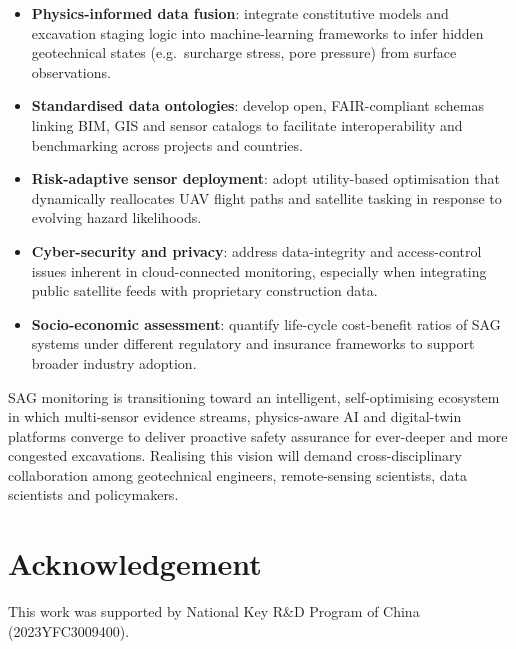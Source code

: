 \documentclass[preprint,11pt,authoryear,3p]{elsarticle}
\begin{document}
\begin{itemize}
    \item \textbf{Physics-informed data fusion}: integrate constitutive models and excavation staging logic into machine-learning frameworks to infer hidden geotechnical states (e.g.\ surcharge stress, pore pressure) from surface observations.
    \item \textbf{Standardised data ontologies}: develop open, FAIR-compliant schemas linking BIM, GIS and sensor catalogs to facilitate interoperability and benchmarking across projects and countries.
    \item \textbf{Risk-adaptive sensor deployment}: adopt utility-based optimisation that dynamically reallocates UAV flight paths and satellite tasking in response to evolving hazard likelihoods.
    \item \textbf{Cyber-security and privacy}: address data-integrity and access-control issues inherent in cloud-connected monitoring, especially when integrating public satellite feeds with proprietary construction data.
    \item \textbf{Socio-economic assessment}: quantify life-cycle cost-benefit ratios of SAG systems under different regulatory and insurance frameworks to support broader industry adoption.
\end{itemize}

SAG monitoring is transitioning toward an intelligent, self-optimising ecosystem in which multi-sensor evidence streams, physics-aware AI and digital-twin platforms converge to deliver proactive safety assurance for ever-deeper and more congested excavations. Realising this vision will demand cross-disciplinary collaboration among geotechnical engineers, remote-sensing scientists, data scientists and policymakers.

\section*{Acknowledgement}

This work was supported by National Key R\&D Program of China (2023YFC3009400).








\end{document}
